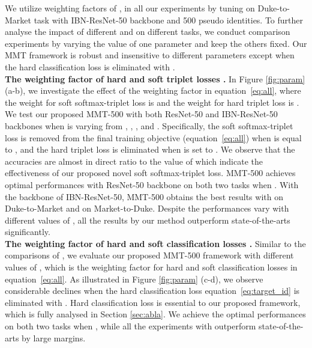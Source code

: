 \documentclass{article} \usepackage{iclr2020_conference,times}
\def\eqref#1{equation~\ref{#1}}
\begin{document}
We utilize weighting factors of ,  in all our experiments by tuning on Duke-to-Market task with IBN-ResNet-50 backbone and 500 pseudo identities.
To further analyse the impact of different  and  on different tasks,
we conduct comparison experiments by varying the value of one parameter and keep the others fixed. 
Our MMT framework is robust and insensitive to different parameters except when the hard classification loss is eliminated with . \\
\noindent\textbf{The weighting factor of hard and soft triplet losses .}
In Figure \ref{fig:param} (a-b),
we investigate the effect of the weighting factor  in \eqref{eq:all},
where the weight for soft softmax-triplet loss is  and the weight for hard triplet loss is .
We test our proposed MMT-500 with both ResNet-50 and IBN-ResNet-50 backbones when  is varying from , , ,  and .
Specifically,
the soft softmax-triplet loss is removed from the final training objective (\eqref{eq:all}) when  is equal to , and the hard triplet loss is eliminated when  is set to .
We observe that
the accuracies are almost in direct ratio to the value of  which indicate the effectiveness of our proposed novel soft softmax-triplet loss.
MMT-500 achieves optimal performances with ResNet-50 backbone on both two tasks when .
With the backbone of IBN-ResNet-50,
MMT-500 obtains the best results with  on Duke-to-Market and  on Market-to-Duke.
Despite the performances vary with different values of ,
all the results by our method outperform state-of-the-arts significantly.
\\
\noindent\textbf{The weighting factor of hard and soft classification losses .}
Similar to the comparisons of ,
we evaluate our proposed MMT-500 framework with different values of , 
which is the weighting factor for hard and soft classification losses in \eqref{eq:all}.
As illustrated in Figure \ref{fig:param} (c-d),
we observe considerable declines 
when the hard classification loss \eqref{eq:target_id} is eliminated with .
Hard classification loss is essential to our proposed framework, which is fully analysed in Section \ref{sec:abla}.
We achieve the optimal performances on both two tasks when , while all the experiments with  outperform state-of-the-arts by large margins.
\end{document}

